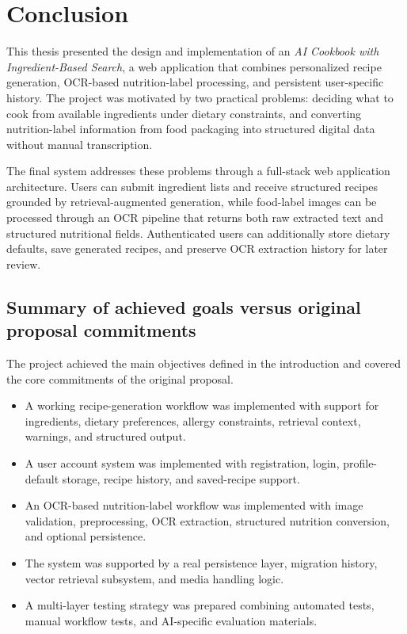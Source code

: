 \chapter{Conclusion}
\label{ch:sum}

This thesis presented the design and implementation of an
\emph{AI Cookbook with Ingredient-Based Search}, a web application that
combines personalized recipe generation, OCR-based nutrition-label
processing, and persistent user-specific history. The project was
motivated by two practical problems: deciding what to cook from
available ingredients under dietary constraints, and converting
nutrition-label information from food packaging into structured digital
data without manual transcription.

The final system addresses these problems through a full-stack web
application architecture. Users can submit ingredient lists and receive
structured recipes grounded by retrieval-augmented generation, while
food-label images can be processed through an OCR pipeline that returns
both raw extracted text and structured nutritional fields.
Authenticated users can additionally store dietary defaults, save
generated recipes, and preserve OCR extraction history for later review.

\section{Summary of achieved goals versus original proposal commitments}

The project achieved the main objectives defined in the introduction and
covered the core commitments of the original proposal.

\begin{itemize}
	\item A working recipe-generation workflow was implemented with support
	for ingredients, dietary preferences, allergy constraints, retrieval
	context, warnings, and structured output.
	\item A user account system was implemented with registration, login,
	profile-default storage, recipe history, and saved-recipe support.
	\item An OCR-based nutrition-label workflow was implemented with image
	validation, preprocessing, OCR extraction, structured nutrition
	conversion, and optional persistence.
	\item The system was supported by a real persistence layer, migration
	history, vector retrieval subsystem, and media handling logic.
	\item A multi-layer testing strategy was prepared combining automated
	tests, manual workflow tests, and AI-specific evaluation materials.
\end{itemize}

